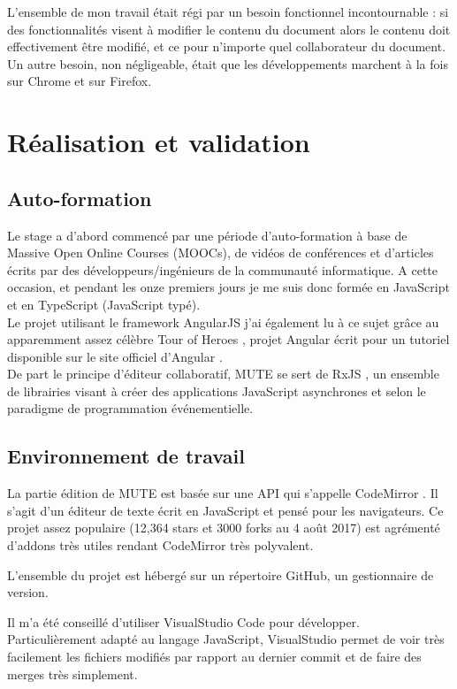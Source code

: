 \documentclass[12pt]{article}
\begin{document}
L'ensemble de mon travail était régi par un besoin fonctionnel incontournable : si des fonctionnalités visent à modifier le contenu du document alors le contenu doit effectivement être modifié, et ce pour n'importe quel collaborateur du document. Un autre besoin, non négligeable, était que les développements marchent à la fois sur Chrome et sur Firefox.

\newpage
\section{Réalisation et validation}
\subsection{Auto-formation}
Le stage a d'abord commencé par une période d'auto-formation à base de Massive Open Online Courses (MOOCs), de vidéos de conférences et d'articles écrits par des développeurs/ingénieurs de la communauté informatique. A cette occasion, et pendant les onze premiers jours je me suis donc formée en JavaScript et en TypeScript (JavaScript typé).\\
Le projet utilisant le framework AngularJS j'ai également lu à ce sujet grâce au apparemment assez célèbre Tour of Heroes \cite{tour}, projet Angular écrit pour un tutoriel disponible sur le site officiel d'Angular \cite{angular}.\\
De part le principe d'éditeur collaboratif, MUTE se sert de RxJS \cite{rxjs}, un ensemble de librairies visant à créer des applications JavaScript asynchrones et selon le paradigme de programmation événementielle.

\subsection{Environnement de travail}
La partie édition de MUTE est basée sur une API qui s'appelle CodeMirror \cite{codemirror}. Il s'agit d'un éditeur de texte écrit en JavaScript et pensé pour les navigateurs. Ce projet assez populaire (12,364 stars et 3000 forks au 4 août 2017) est agrémenté d'addons très utiles rendant CodeMirror très polyvalent.

L'ensemble du projet est hébergé sur un répertoire GitHub, un gestionnaire de version.

Il m'a été conseillé d'utiliser VisualStudio Code pour développer. Particulièrement adapté au langage JavaScript, VisualStudio permet de voir très facilement les fichiers modifiés par rapport au dernier commit et de faire des merges très simplement.
\end{document}

